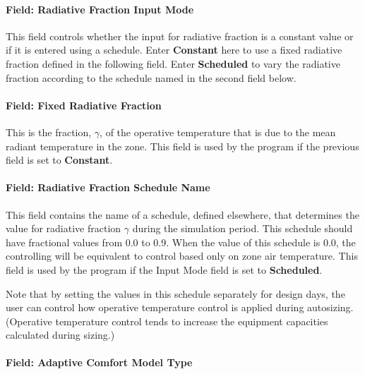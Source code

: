 \paragraph{Field: Radiative Fraction Input Mode}\label{field-radiative-fraction-input-mode}

This field controls whether the input for radiative fraction is a constant value or if it is entered using a schedule. Enter \textbf{Constant} here to use a fixed radiative fraction defined in the following field. Enter \textbf{Scheduled} to vary the radiative fraction according to the schedule named in the second field below.

\paragraph{Field: Fixed Radiative Fraction}\label{field-fixed-radiative-fraction}

This is the fraction, \(\gamma\), of the operative temperature that is due to the mean radiant temperature in the zone. This field is used by the program if the previous field is set to \textbf{Constant}.

\paragraph{Field: Radiative Fraction Schedule Name}\label{field-radiative-fraction-schedule-name}

This field contains the name of a schedule, defined elsewhere, that determines the value for radiative fraction \(\gamma\) during the simulation period. This schedule should have fractional values from 0.0 to 0.9. When the value of this schedule is 0.0, the controlling will be equivalent to control based only on zone air temperature. This field is used by the program if the Input Mode field is set to \textbf{Scheduled}.

Note that by setting the values in this schedule separately for design days, the user can control how operative temperature control is applied during autosizing. (Operative temperature control tends to increase the equipment capacities calculated during sizing.)

\paragraph{Field: Adaptive Comfort Model Type}\label{field-adaptive-comfort-mode-type}

